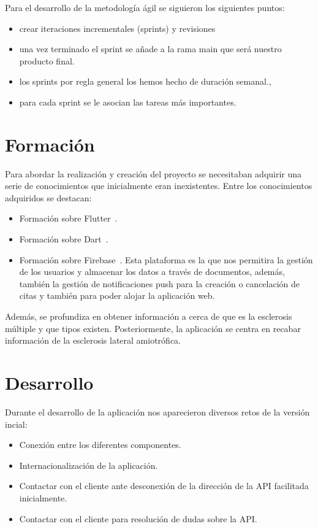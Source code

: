 Para el desarrollo de la metodología ágil se siguieron los siguientes puntos:
\begin{itemize}
\item crear iteraciones incrementales (sprints) y revisiones
\item una vez terminado el sprint se añade a la rama main que será nuestro producto final.
\item los sprints por regla general los hemos hecho de duración semanal.,
\item para cada sprint se le asocian las tareas más importantes.
\end{itemize}

\section{Formación}
Para abordar la realización y creación del proyecto se necesitaban adquirir una serie de conocimientos que inicialmente eran inexistentes. Entre los conocimientos adquiridos se destacan:
\begin{itemize}
\item Formación sobre Flutter~\cite{flutter,formacionFlutter}.
\item Formación sobre Dart~\cite{dart}.
\item Formación sobre Firebase~\cite{firebase}. Esta plataforma es la que nos permitira la gestión de los usuarios y almacenar los datos a través de documentos, además, también la gestión de notificaciones push para la creación o cancelación de citas y también para poder alojar la aplicación web.
\end{itemize}

Además, se profundiza en obtener información a cerca de que es la esclerosis múltiple y que tipos existen. Posteriormente, la aplicación se centra en recabar información de la esclerosis lateral amiotrófica.

\section{Desarrollo}
Durante el desarrollo de la aplicación nos aparecieron diversos retos de la versión incial:
\begin{itemize}
\item Conexión entre los diferentes componentes.
\item Internacionalización de la aplicación.
\item Contactar con el cliente ante desconexión de la dirección de la API facilitada inicialmente.
\item Contactar con el cliente para resolución de dudas sobre la API.
\end{itemize}

